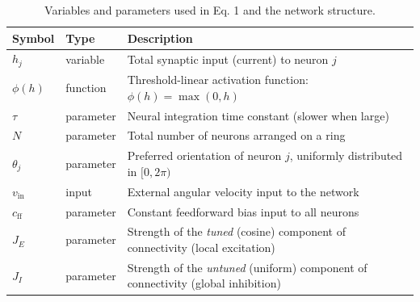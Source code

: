 \documentclass[11pt,a4paper]{article}
\begin{document}

\begin{table}[h!]
\centering
\begin{tabular}{@{}llp{9cm}@{}}
\toprule
\textbf{Symbol} & \textbf{Type} & \textbf{Description} \\
\midrule
\( h_j \) & variable & Total synaptic input (current) to neuron \( j \) \\
\( \phi(h) \) & function & Threshold-linear activation function: \( \phi(h) = \max(0, h) \) \\
\( \tau \) & parameter & Neural integration time constant (slower when large) \\
\( N \) & parameter & Total number of neurons arranged on a ring \\
\( \theta_j \) & parameter & Preferred orientation of neuron \( j \), uniformly distributed in \([0, 2\pi)\) \\
\( v_{\text{in}} \) & input & External angular velocity input to the network \\
\( c_{\text{ff}} \) & parameter & Constant feedforward bias input to all neurons \\
\( J_E \) & parameter & Strength of the \emph{tuned} (cosine) component of connectivity (local excitation) \\
\( J_I \) & parameter & Strength of the \emph{untuned} (uniform) component of connectivity (global inhibition) \\
\bottomrule
\end{tabular}
\caption{Variables and parameters used in Eq. 1 and the network structure.}
\end{table}
\end{document}

